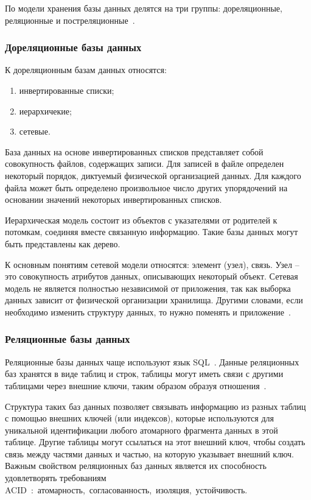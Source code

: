 По модели хранения базы данных делятся на три группы: дореляционные, реляционные и постреляционные~\cite{Date}. 
\newpage
\subsubsection{Дореляционные базы данных}
К дореляционным базам данных относятся:
\begin{enumerate}[label*=---]
	\item инвертированные списки;
	\item иерархичекие;
	\item сетевые.
\end{enumerate}

База данных на основе инвертированных списков представляет собой совокупность файлов, содержащих записи. Для записей в файле определен некоторый порядок, диктуемый физической организацией данных. Для каждого файла может быть определено произвольное число других упорядочений на основании значений некоторых инвертированных списков. 

Иерархическая модель  состоит из объектов с указателями от родителей к потомкам, соединяя вместе связанную информацию. Такие базы данных могут быть представлены как дерево.

К основным понятиям сетевой модели относятся: элемент (узел), связь. Узел -- это совокупность атрибутов данных, описывающих некоторый объект. Сетевая модель не является полностью независимой от приложения, так как выборка данных зависит от физической организации хранилища. Другими словами, если необходимо изменить структуру данных, то нужно поменять и приложение~\cite{Begg}.

\subsubsection{Реляционные базы данных}

Реляционные базы данных чаще используют язык SQL~\cite{oracle}. Данные реляционных баз хранятся в виде таблиц и строк, таблицы могут иметь связи с другими таблицами через внешние ключи, таким образом образуя отношения~\cite{sql}. 

Структура таких баз данных позволяет связывать информацию из разных таблиц с помощью внешних ключей (или индексов), которые используются для уникальной идентификации любого атомарного фрагмента данных в этой таблице. Другие таблицы могут ссылаться на этот внешний ключ, чтобы создать связь между частями данных и частью, на которую указывает внешний ключ. Важным свойством реляционных баз данных является их способность удовлетворять требованиям ACID~\cite{acid}:~атомарность,~согласованность,~изоляция,~устойчивость.

